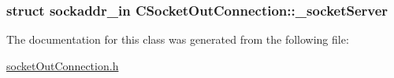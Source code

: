 \subsubsection[{\texorpdfstring{\+\_\+socket\+Server}{_socketServer}}]{\setlength{\rightskip}{0pt plus 5cm}struct sockaddr\+\_\+in C\+Socket\+Out\+Connection\+::\+\_\+socket\+Server\hspace{0.3cm}{\ttfamily [protected]}}\hypertarget{classCSocketOutConnection_a7a4a2efbc8fced507bd76b88c2725af3}{}\label{classCSocketOutConnection_a7a4a2efbc8fced507bd76b88c2725af3}


The documentation for this class was generated from the following file\+:\begin{DoxyCompactItemize}
\item 
\hyperlink{socketOutConnection_8h}{socket\+Out\+Connection.\+h}\end{DoxyCompactItemize}
